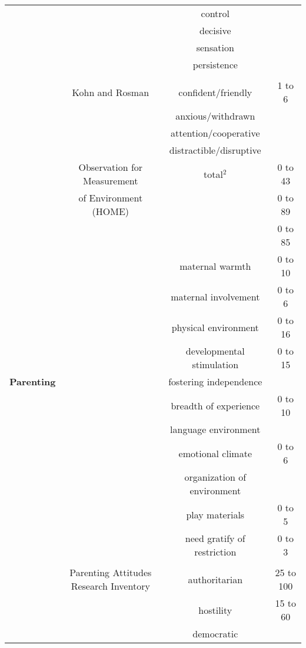 \begin{ThreePartTable}
\begin{longtable}{c c c c}
        & & control & \\
        & & decisive & \\
        & & sensation & \\
        & & persistence & \\
        & & & \\
        & Kohn and Rosman & confident/friendly & 1 to 6 \\
        & \citet{Kohn.Rosman_1972_DP}& anxious/withdrawn & \\
        & & attention/cooperative & \\
        & & distractible/disruptive &\\
      \midrule
        & Observation for Measurement & total$^2$ & 0 to 43 \\ 
        & of Environment (HOME) & & 0 to 89 \\
        & \citet{Bradley-Caldwell_1977_AJMD} & & 0 to 85 \\
        & & maternal warmth & 0 to 10\\
        & & maternal involvement & 0 to 6\\
        & & physical environment & 0 to 16 \\
        & & developmental stimulation & 0 to 15\\
        \textbf{Parenting}& & fostering independence & \\
        & & breadth of experience & 0 to 10 \\
        & & language environment & \\
        & & emotional climate & 0 to 6 \\
        & & organization of environment & \\
        & & play materials & 0 to 5 \\
        & & need gratify of restriction & 0 to 3 \\
        & & & \\
        & Parenting Attitudes Research Inventory & authoritarian & 25 to 100 \\
        & \citet{Schaefer-Bell_1958_CD}& hostility & 15 to 60 \\
        & & democratic & \\
     \bottomrule
  \end{longtable}
\end{ThreePartTable}


